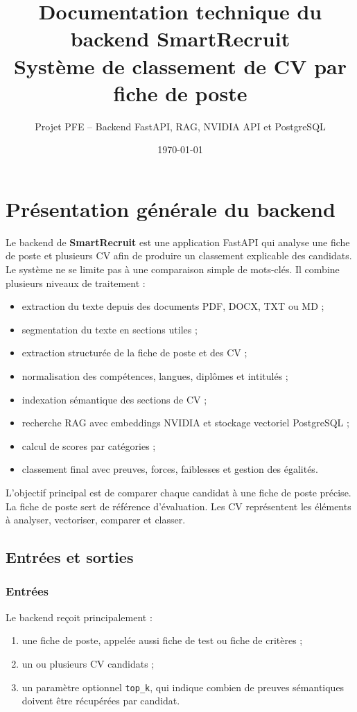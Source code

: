 \documentclass[12pt,a4paper]{report}
\title{
    \textbf{Documentation technique du backend SmartRecruit}\\
    \large Système de classement de CV par fiche de poste
}
\author{Projet PFE -- Backend FastAPI, RAG, NVIDIA API et PostgreSQL}
\date{\today}
\begin{document}
\maketitle
\tableofcontents
\newpage

\chapter{Présentation générale du backend}

Le backend de \textbf{SmartRecruit} est une application FastAPI qui analyse une fiche de poste et plusieurs CV afin de produire un classement explicable des candidats. Le système ne se limite pas à une comparaison simple de mots-clés. Il combine plusieurs niveaux de traitement :

\begin{itemize}
    \item extraction du texte depuis des documents PDF, DOCX, TXT ou MD ;
    \item segmentation du texte en sections utiles ;
    \item extraction structurée de la fiche de poste et des CV ;
    \item normalisation des compétences, langues, diplômes et intitulés ;
    \item indexation sémantique des sections de CV ;
    \item recherche RAG avec embeddings NVIDIA et stockage vectoriel PostgreSQL ;
    \item calcul de scores par catégories ;
    \item classement final avec preuves, forces, faiblesses et gestion des égalités.
\end{itemize}

L'objectif principal est de comparer chaque candidat à une fiche de poste précise. La fiche de poste sert de référence d'évaluation. Les CV représentent les éléments à analyser, vectoriser, comparer et classer.

\section{Entrées et sorties}

\subsection{Entrées}

Le backend reçoit principalement :

\begin{enumerate}
    \item une fiche de poste, appelée aussi fiche de test ou fiche de critères ;
    \item un ou plusieurs CV candidats ;
    \item un paramètre optionnel \texttt{top\_k}, qui indique combien de preuves sémantiques doivent être récupérées par candidat.
\end{enumerate}
\end{document}

